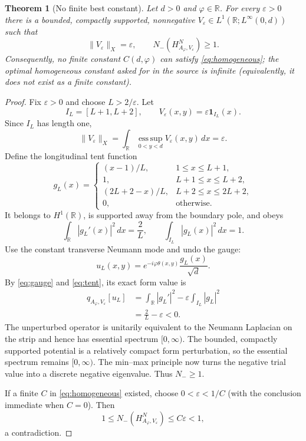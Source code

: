 \documentclass[11pt]{article}
\newtheorem{theorem}{Theorem}
\newcommand{\R}{\mathbb{R}}
\newcommand{\Nminus}{N_{-}}
\begin{document}
\begin{theorem}[No finite best constant]\label{thm:counterexample}
Let $d>0$ and $\varphi\in\R$.  For every $\varepsilon>0$ there is a bounded,
compactly supported, nonnegative $V_\varepsilon\in
L^1(\R;L^\infty(0,d))$ such that
\[
 \lVert V_\varepsilon\rVert_X=\varepsilon,
 \qquad
 \Nminus(H^N_{A_\varphi,V_\varepsilon})\ge1.
\]
Consequently, no finite constant $C(d,\varphi)$ can satisfy
\eqref{eq:homogeneous}; the optimal homogeneous constant asked for in the
source is infinite (equivalently, it does not exist as a finite constant).
\end{theorem}

\begin{proof}
Fix $\varepsilon>0$ and choose $L>2/\varepsilon$.  Let
\[
 I_L=[L+1,L+2],\qquad
 V_\varepsilon(x,y)=\varepsilon\mathbf 1_{I_L}(x).
\]
Since $I_L$ has length one,
\[
 \lVert V_\varepsilon\rVert_X
 =\int_\R\operatorname*{ess\,sup}_{0<y<d}
   V_\varepsilon(x,y)\,dx=\varepsilon.
\]
Define the longitudinal tent function
\[
 g_L(x)=
 \begin{cases}
  (x-1)/L,&1\le x\le L+1,\\
  1,&L+1\le x\le L+2,\\
  (2L+2-x)/L,&L+2\le x\le2L+2,\\
  0,&\text{otherwise}.
 \end{cases}
\]
It belongs to $H^1(\R)$, is supported away from the boundary pole, and obeys
\begin{equation}\label{eq:tent}
 \int_\R|g_L'(x)|^2\,dx=\frac2L,
 \qquad
 \int_{I_L}|g_L(x)|^2\,dx=1.
\end{equation}
Use the constant transverse Neumann mode and undo the gauge:
\[
 u_L(x,y)=e^{-i\varphi\theta(x,y)}\frac{g_L(x)}{\sqrt d}.
\]
By \eqref{eq:gauge} and \eqref{eq:tent}, its exact form value is
\begin{align*}
 q_{A_\varphi,V_\varepsilon}[u_L]
 &=\int_\R|g_L'|^2
   -\varepsilon\int_{I_L}|g_L|^2\\
 &=\frac2L-\varepsilon<0.
\end{align*}
The unperturbed operator is unitarily equivalent to the Neumann Laplacian on
the strip and hence has essential spectrum $[0,\infty)$.  The bounded,
compactly supported potential is a relatively compact form perturbation, so
the essential spectrum remains $[0,\infty)$.  The min--max principle now
turns the negative trial value into a discrete negative eigenvalue.  Thus
$\Nminus\ge1$.

If a finite $C$ in \eqref{eq:homogeneous} existed, choose
$0<\varepsilon<1/C$ (with the conclusion immediate when $C=0$).  Then
\[
 1\le\Nminus(H^N_{A_\varphi,V_\varepsilon})
 \le C\varepsilon<1,
\]
a contradiction.
\end{proof}
\end{document}
